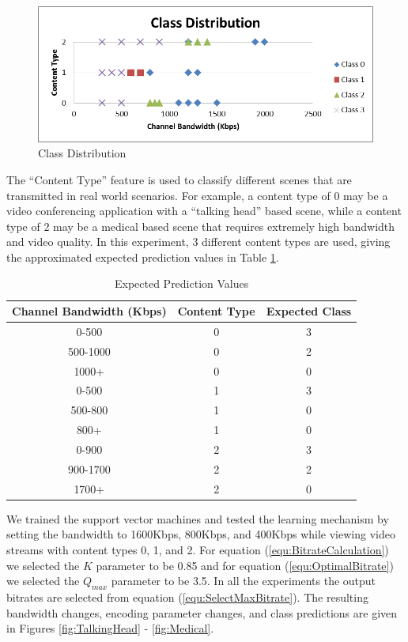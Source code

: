 \documentclass[3p,times,procedia]{elsarticle}
\begin{document}
\begin{figure}[H]
\centering
\includegraphics[width=0.65\linewidth]{ClassDistribution.png}
\caption{Class Distribution}
\label{fig:ClassDistribution}
\end{figure}
The ``Content Type'' feature is used to classify different scenes that are transmitted in real world scenarios. For example, a content type of 0 may be a video conferencing application with a ``talking head'' based scene, while a content type of 2 may be a medical based scene that requires extremely high bandwidth and video quality. In this experiment, 3 different content types are used, giving the approximated expected prediction values in Table \ref{tab:ExpectedValues}.
\begin{table}[H]
\centering
\caption{Expected Prediction Values}
\label{tab:ExpectedValues}
\begin{tabular}{c|c|c}
\textbf{Channel Bandwidth (Kbps)}&\textbf{Content Type}&\textbf{Expected Class}\\
\hline
0-500&0&3\\
500-1000&0&2\\
1000+&0&0\\
0-500&1&3\\
500-800&1&0\\
800+&1&0\\
0-900&2&3\\
900-1700&2&2\\
1700+&2&0
\end{tabular}
\end{table}
We trained the support vector machines and tested the learning mechanism by setting the bandwidth to 1600Kbps, 800Kbps, and 400Kbps while viewing video streams with content types 0, 1, and 2. For equation (\ref{equ:BitrateCalculation}) we selected the $K$ parameter to be 0.85 and for equation (\ref{equ:OptimalBitrate}) we selected the $Q_{max}$ parameter to be 3.5. In all the experiments the output bitrates are selected from equation (\ref{equ:SelectMaxBitrate}). The resulting bandwidth changes, encoding parameter changes, and class predictions are given in Figures \ref{fig:TalkingHead} - \ref{fig:Medical}.
\end{document}
